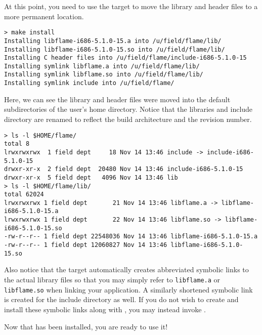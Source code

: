 At this point, you need to use the \install target to move the library
and header files to a more permanent location.

\begin{Verbatim}[frame=single,framesep=2.5mm,xleftmargin=5mm,commandchars=\\\{\},fontsize=\footnotesize]
> make install
Installing libflame-i686-5.1.0-15.a into /u/field/flame/lib/
Installing libflame-i686-5.1.0-15.so into /u/field/flame/lib/
Installing C header files into /u/field/flame/include-i686-5.1.0-15
Installing symlink libflame.a into /u/field/flame/lib/
Installing symlink libflame.so into /u/field/flame/lib/
Installing symlink include into /u/field/flame/
\end{Verbatim}

\noindent
Here, we can see the library and header files were moved into the default
subdirectories of the user's home directory.
Notice that the libraries and include directory are renamed to reflect
the build architecture and the revision number.

\begin{Verbatim}[frame=single,framesep=2.5mm,xleftmargin=5mm,commandchars=\\\{\},fontsize=\footnotesize]
> ls -l $HOME/flame/
total 8
lrwxrwxrwx  1 field dept     18 Nov 14 13:46 include -> include-i686-5.1.0-15
drwxr-xr-x  2 field dept  20480 Nov 14 13:46 include-i686-5.1.0-15
drwxr-xr-x  5 field dept   4096 Nov 14 13:46 lib
> ls -l $HOME/flame/lib/
total 62024
lrwxrwxrwx 1 field dept       21 Nov 14 13:46 libflame.a -> libflame-i686-5.1.0-15.a
lrwxrwxrwx 1 field dept       22 Nov 14 13:46 libflame.so -> libflame-i686-5.1.0-15.so
-rw-r--r-- 1 field dept 22548036 Nov 14 13:46 libflame-i686-5.1.0-15.a
-rw-r--r-- 1 field dept 12060827 Nov 14 13:46 libflame-i686-5.1.0-15.so
\end{Verbatim}

\noindent
Also notice that the \install target automatically creates abbreviated symbolic
links to the actual library files so that you may simply refer to
{\tt libflame.a} or {\tt libflame.so} when linking your application.
A similarly shortened symbolic link is created for the include directory
as well.
If you do not wish to create and install these symbolic links along with
\libflamens, you may instead invoke \installwithoutsymlinksns.

Now that \libflame has been installed, you are ready to use it!

